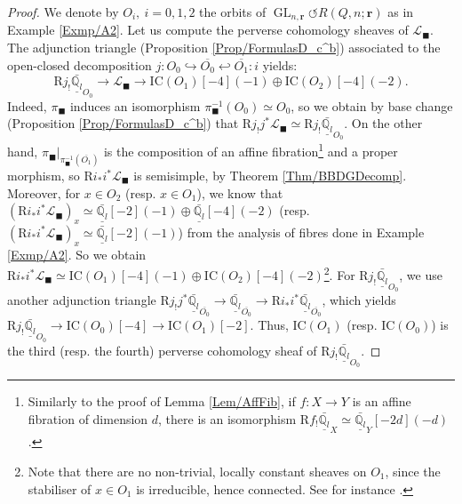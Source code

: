 \documentclass[11pt,english]{article}
\numberwithin{equation}{section}
\numberwithin{figure}{section}
\theoremstyle{definition}
\theoremstyle{plain}
\theoremstyle{remark}
\DeclareMathOperator{\GL}{GL}
\newcommand\rr{\mathbf{r}}
\newcommand\QQ{\mathbb{Q}}
\begin{document}
\begin{proof}

We denote by $O_{i},\ i=0,1,2$ the orbits of $\GL_{n,\rr}\circlearrowleft R(Q,n;\rr)$
as in Example \ref{Exmp/A2}. Let us compute the perverse cohomology
sheaves of $\mathcal{L}_{\blacksquare}$. The adjunction triangle
(Proposition \ref{Prop/FormulasD_c^b}) associated to the open-closed
decomposition $j:O_{0}\hookrightarrow\overline{O_{0}}\hookleftarrow\overline{O_{1}}:i$
yields:\[
\mathrm{R}j_!\underline{\bar{\QQ_l}}_{O_0}\rightarrow\mathcal{L}_{\blacksquare}\rightarrow\mathrm{IC}(O_1)[-4](-1)\oplus\mathrm{IC}(O_2)[-4](-2).
\]Indeed, $\pi_{\blacksquare}$ induces an isomorphism $\pi_{\blacksquare}^{-1}(O_{0})\simeq O_{0}$,
so we obtain by base change (Proposition \ref{Prop/FormulasD_c^b})
that $\mathrm{R}j_{!}j^{*}\mathcal{L}_{\blacksquare}\simeq\mathrm{R}j_{!}\underline{\bar{\QQ_{l}}}_{O_{0}}$.
On the other hand, $\pi_{\blacksquare}\vert_{\pi_{\blacksquare}^{-1}(\overline{O_{1}})}$
is the composition of an affine fibration\footnote{Similarly to the proof of Lemma \ref{Lem/AffFib}, if $f:X\rightarrow Y$
is an affine fibration of dimension $d$, there is an isomorphism
$\mathrm{R}f_{!}\underline{\bar{\QQ_{l}}}_{X}\simeq\underline{\bar{\QQ_{l}}}_{Y}[-2d](-d)$.} and a proper morphism, so $\mathrm{R}i_{*}i^{*}\mathcal{L}_{\blacksquare}$
is semisimple, by Theorem \ref{Thm/BBDGDecomp}. Moreover, for $x\in O_{2}$
(resp. $x\in O_{1}$), we know that $(\mathrm{R}i_{*}i^{*}\mathcal{L}_{\blacksquare})_{x}\simeq\underline{\bar{\QQ_{l}}}[-2](-1)\oplus\underline{\bar{\QQ_{l}}}[-4](-2)$
(resp. $(\mathrm{R}i_{*}i^{*}\mathcal{L}_{\blacksquare})_{x}\simeq\underline{\bar{\QQ_{l}}}[-2](-1)$)
from the analysis of fibres done in Example \ref{Exmp/A2}. So we
obtain $\mathrm{R}i_{*}i^{*}\mathcal{L}_{\blacksquare}\simeq\mathrm{IC}(O_{1})[-4](-1)\oplus\mathrm{IC}(O_{2})[-4](-2)$\footnote{Note that there are no non-trivial, locally constant sheaves on $O_{1}$,
since the stabiliser of $x\in O_{1}$ is irreducible, hence connected.
See for instance \cite[\S III.15.]{KW01}.}. For $\mathrm{R}j_{!}\underline{\bar{\QQ_{l}}}_{O_{0}}$, we use
another adjunction triangle $\mathrm{R}j_{!}j^{*}\underline{\bar{\QQ_{l}}}_{\overline{O_{0}}}\rightarrow\underline{\bar{\QQ_{l}}}_{\overline{O_{0}}}\rightarrow\mathrm{R}i_{*}i^{*}\underline{\bar{\QQ_{l}}}_{\overline{O_{0}}}$,
which yields $\mathrm{R}j_{!}\underline{\bar{\QQ_{l}}}_{O_{0}}\rightarrow\mathrm{IC}(O_{0})[-4]\rightarrow\mathrm{IC}(O_{1})[-2]$.
Thus, $\mathrm{IC}(O_{1})$ (resp. $\mathrm{IC}(O_{0})$) is the third
(resp. the fourth) perverse cohomology sheaf of $\mathrm{R}j_{!}\underline{\bar{\QQ_{l}}}_{O_{0}}$.

\end{proof}
\end{document}
